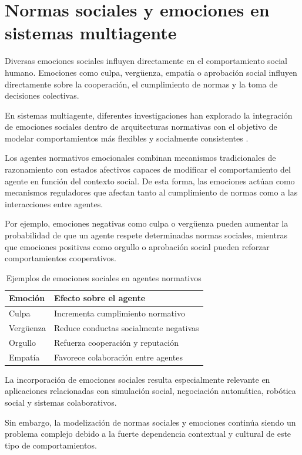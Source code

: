 \section{Normas sociales y emociones en sistemas multiagente}

Diversas emociones sociales influyen directamente en el comportamiento social humano. Emociones como culpa, vergüenza, empatía o aprobación social influyen directamente sobre la cooperación, el cumplimiento de normas y la toma de decisiones colectivas.

En sistemas multiagente, diferentes investigaciones han explorado la integración de emociones sociales dentro de arquitecturas normativas con el objetivo de modelar comportamientos más flexibles y socialmente consistentes \cite{argente2022normative}.

Los agentes normativos emocionales combinan mecanismos tradicionales de razonamiento con estados afectivos capaces de modificar el comportamiento del agente en función del contexto social. De esta forma, las emociones actúan como mecanismos reguladores que afectan tanto al cumplimiento de normas como a las interacciones entre agentes.

Por ejemplo, emociones negativas como culpa o vergüenza pueden aumentar la probabilidad de que un agente respete determinadas normas sociales, mientras que emociones positivas como orgullo o aprobación social pueden reforzar comportamientos cooperativos.

\begin{table}[H]
\centering
\caption{Ejemplos de emociones sociales en agentes normativos}
\begin{tabular}{p{4cm} p{8cm}}
\toprule
\textbf{Emoción} & \textbf{Efecto sobre el agente} \\
\midrule
Culpa & Incrementa cumplimiento normativo \\
Vergüenza & Reduce conductas socialmente negativas \\
Orgullo & Refuerza cooperación y reputación \\
Empatía & Favorece colaboración entre agentes \\
\bottomrule
\end{tabular}
\end{table}

La incorporación de emociones sociales resulta especialmente relevante en aplicaciones relacionadas con simulación social, negociación automática, robótica social y sistemas colaborativos.

Sin embargo, la modelización de normas sociales y emociones continúa siendo un problema complejo debido a la fuerte dependencia contextual y cultural de este tipo de comportamientos.